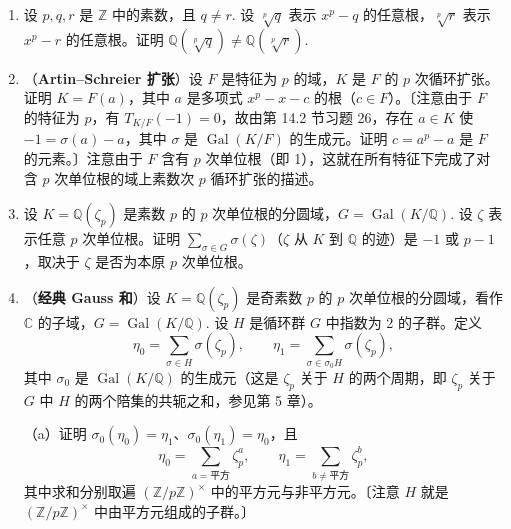 \begin{enumerate}
（a）证明 \(\sigma(\sqrt[d]{a}) = \zeta\sqrt[d]{a}\)，其中 \(\zeta\) 是某个本原 \(d\) 次单位根（事实上 \(\sigma\) 在 \(\sqrt[d]{a}\) 上的作用由 \(\zeta\) 给出）。

（b）假设 \(K = F(\sqrt[d]{a}) = F(\sqrt[d]{b})\). 用（a）证明 \(\frac{\sqrt[d]{a}}{\sqrt[d]{b}} = \zeta^i\)，其中 \(i\) 是与 \(d\) 互素的某个整数。由此证明 \(\sigma\) 固定元素 \(\frac{\sqrt[d]{a}}{\sqrt[d]{b}}\)，故它是 \(F\) 的元素。

（c）证明 \(K = F(\sqrt[d]{a}) = F(\sqrt[d]{b})\) 当且仅当存在 \(c, e \in F\) 使 \(a = b^ic^d\) 且 \(b = a^je^d\)，即当且仅当 \(a\) 与 \(b\) 在 \(F^\times\) 模去 \(d\) 次幂后生成同一个子群。

\item 设 \(p, q, r\) 是 \(\mathbb{Z}\) 中的素数，且 \(q \neq r\). 设 \(\sqrt[p]{q}\) 表示 \(x^p-q\) 的任意根，\(\sqrt[p]{r}\) 表示 \(x^p-r\) 的任意根。证明 \(\mathbb{Q}(\sqrt[p]{q}) \neq \mathbb{Q}(\sqrt[p]{r})\).

\item （\textbf{Artin--Schreier 扩张}）设 \(F\) 是特征为 \(p\) 的域，\(K\) 是 \(F\) 的 \(p\) 次循环扩张。证明 \(K = F(a)\)，其中 \(a\) 是多项式 \(x^p-x-c\) 的根（\(c \in F\)）。〔注意由于 \(F\) 的特征为 \(p\)，有 \(T_{K/F}(-1) = 0\)，故由第 14.2 节习题 26，存在 \(a \in K\) 使 \(-1 = \sigma(a)-a\)，其中 \(\sigma\) 是 \(\operatorname{Gal}(K/F)\) 的生成元。证明 \(c = a^p-a\) 是 \(F\) 的元素。〕注意由于 \(F\) 含有 \(p\) 次单位根（即 1），这就在所有特征下完成了对含 \(p\) 次单位根的域上素数次 \(p\) 循环扩张的描述。

\item 设 \(K = \mathbb{Q}(\zeta_p)\) 是素数 \(p\) 的 \(p\) 次单位根的分圆域，\(G = \operatorname{Gal}(K/\mathbb{Q})\). 设 \(\zeta\) 表示任意 \(p\) 次单位根。证明 \(\sum_{\sigma \in G}\sigma(\zeta)\)（\(\zeta\) 从 \(K\) 到 \(\mathbb{Q}\) 的迹）是 \(-1\) 或 \(p-1\)，取决于 \(\zeta\) 是否为本原 \(p\) 次单位根。

\item （\textbf{经典 Gauss 和}）设 \(K = \mathbb{Q}(\zeta_p)\) 是奇素数 \(p\) 的 \(p\) 次单位根的分圆域，看作 \(\mathbb{C}\) 的子域，\(G = \operatorname{Gal}(K/\mathbb{Q})\). 设 \(H\) 是循环群 \(G\) 中指数为 2 的子群。定义
\[
\eta_0 = \sum_{\sigma \in H}\sigma(\zeta_p), \qquad \eta_1 = \sum_{\sigma \in \sigma_0H}\sigma(\zeta_p),
\]
其中 \(\sigma_0\) 是 \(\operatorname{Gal}(K/\mathbb{Q})\) 的生成元（这是 \(\zeta_p\) 关于 \(H\) 的两个周期，即 \(\zeta_p\) 关于 \(G\) 中 \(H\) 的两个陪集的共轭之和，参见第 5 章）。

（a）证明 \(\sigma_0(\eta_0) = \eta_1\)、\(\sigma_0(\eta_1) = \eta_0\)，且
\[
\eta_0 = \sum_{a = \text{平方}}\zeta_p^a, \qquad \eta_1 = \sum_{b \neq \text{平方}}\zeta_p^b,
\]
其中求和分别取遍 \((\mathbb{Z}/p\mathbb{Z})^\times\) 中的平方元与非平方元。〔注意 \(H\) 就是 \((\mathbb{Z}/p\mathbb{Z})^\times\) 中由平方元组成的子群。〕


\end{enumerate}
